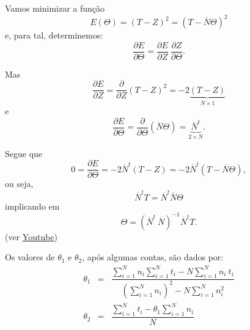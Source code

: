 \begin{exercise}
\begin{description}
{Vamos minimizar a função
\[E(\Theta)
= (T-Z)^2
= (T-\overline{N}\Theta)^2
\]
e, para tal, determinemos:
\[
\dfrac{\partial E}{\partial \Theta}
= \dfrac{\partial E}{\partial Z}\ \dfrac{\partial Z}{\partial \Theta}.
\]

Mas
\[
\dfrac{\partial E}{\partial Z}
= \dfrac{\partial}{\partial Z} (T-Z)^2 = -2 \underbrace{(T-Z)}_{N \times 1}
\]
e
\[
\dfrac{\partial E}{\partial \Theta}
= \dfrac{\partial}{\partial \Theta} (\overline{N}\Theta) =  \underbrace{\overline{N}^t}_{2 \times N}.
\]

Segue que
\[0
= \dfrac{\partial E}{\partial \Theta}
= -2 \overline{N}^t (T-Z)
= -2 \overline{N}^t (T-\overline{N}\Theta),
\]
ou seja,
\[
\overline{N}^t T = \overline{N}^t \overline{N} \Theta
\]
implicando em
\[
\Theta = (\overline{N}^t\ \overline{N})^{-1} \overline{N}^t T.
\]
(ver \href{https://www.youtube.com/watch?v=txnrFZG7Ugs&ab_channel=LeonardoOlivi}{Youtube})


Os valores de \(\theta_1\) e \(\theta_2\), após algumas contas, são dados por:
\[\begin{array}{rcl}
\theta_1 &=& \dfrac{\displaystyle\sum_{i=1}^{N} n_i \sum_{i=1}^{N} t_i - N \sum_{i=1}^{N} n_i\ t_i}{\displaystyle\left(\sum_{i=1}^{N} n_i\right)^2 - N \sum_{i=1}^{N} n_i^2} \\
\theta_2 &=& \dfrac{\displaystyle\sum_{i=1}^{N} t_i - \theta_1 \sum_{i=1}^{N} n_i}{N}
\end{array}
\]

}
\end{description}
\end{exercise}
